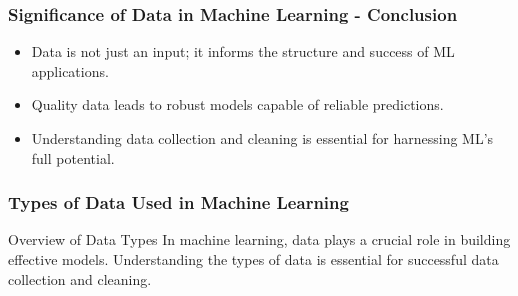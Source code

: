 \documentclass[aspectratio=169]{beamer}
\begin{document}
\begin{frame}[fragile]
    \frametitle{Significance of Data in Machine Learning - Conclusion}
    \begin{itemize}
        \item Data is not just an input; it informs the structure and success of ML applications.
        \item Quality data leads to robust models capable of reliable predictions.
        \item Understanding data collection and cleaning is essential for harnessing ML's full potential.
    \end{itemize}
\end{frame}

\begin{frame}[fragile]
    \frametitle{Types of Data Used in Machine Learning}
    \begin{block}{Overview of Data Types}
        In machine learning, data plays a crucial role in building effective models. Understanding the types of data is essential for successful data collection and cleaning.
    \end{block}
\end{frame}
\end{document}
